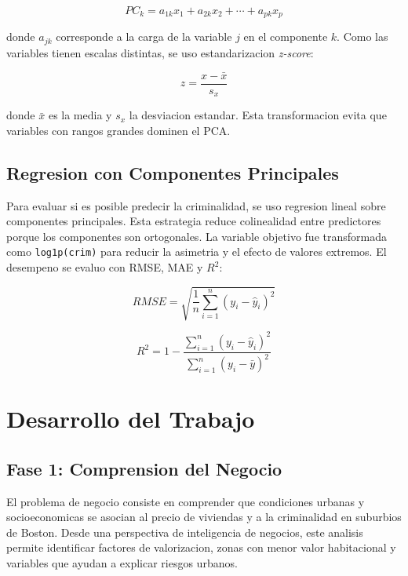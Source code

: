 \documentclass[10pt,a4paper]{article}
\begin{document}
\begin{equation}
  PC_k = a_{1k}x_1 + a_{2k}x_2 + \cdots + a_{pk}x_p
\end{equation}

donde $a_{jk}$ corresponde a la carga de la variable $j$ en el componente $k$. Como las variables tienen escalas distintas, se uso estandarizacion \textit{z-score}:

\begin{equation}
  z = \frac{x - \bar{x}}{s_x}
\end{equation}

donde $\bar{x}$ es la media y $s_x$ la desviacion estandar. Esta transformacion evita que variables con rangos grandes dominen el PCA.

\subsection{Regresion con Componentes Principales}

Para evaluar si es posible predecir la criminalidad, se uso regresion lineal sobre componentes principales. Esta estrategia reduce colinealidad entre predictores porque los componentes son ortogonales. La variable objetivo fue transformada como \texttt{log1p(crim)} para reducir la asimetria y el efecto de valores extremos. El desempeno se evaluo con RMSE, MAE y $R^2$:

\begin{equation}
  RMSE = \sqrt{\frac{1}{n}\sum_{i=1}^{n}(y_i - \hat{y}_i)^2}
\end{equation}

\begin{equation}
  R^2 = 1 - \frac{\sum_{i=1}^{n}(y_i - \hat{y}_i)^2}{\sum_{i=1}^{n}(y_i - \bar{y})^2}
\end{equation}

\section{Desarrollo del Trabajo}

\subsection{Fase 1: Comprension del Negocio}

El problema de negocio consiste en comprender que condiciones urbanas y socioeconomicas se asocian al precio de viviendas y a la criminalidad en suburbios de Boston. Desde una perspectiva de inteligencia de negocios, este analisis permite identificar factores de valorizacion, zonas con menor valor habitacional y variables que ayudan a explicar riesgos urbanos.
\end{document}
